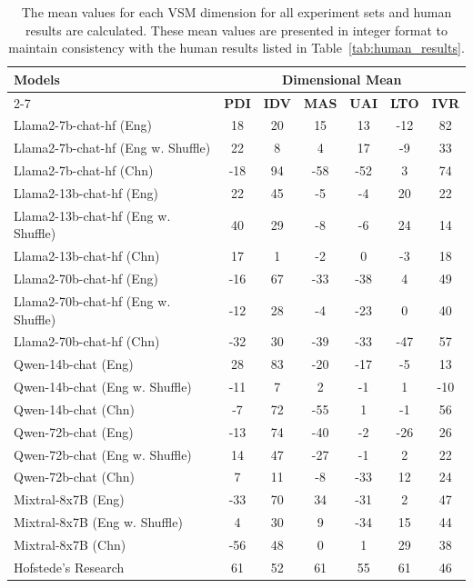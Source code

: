 \documentclass[11pt]{article}
\begin{document}
\begin{table}[!hbt]
\centering
\renewcommand{\arraystretch}{1.25}
\begin{tabular}{l|c|c|c|c|c|c}
\hline
\multirow{2}{*}{\textbf{Models}} & \multicolumn{6}{c}{\textbf{Dimensional Mean}}\\
\cline{2-7}
{} & {\textbf{PDI}} & {\textbf{IDV}} & {\textbf{MAS}} & {\textbf{UAI}} & {\textbf{LTO}} & {\textbf{IVR}} \\
\hline
{Llama2-7b-chat-hf (Eng) } & 18 & 20 & 15 & 13 & -12 & 82 \\
{Llama2-7b-chat-hf (Eng w. Shuffle) } & 22 & 8 & 4 & 17 & -9 & 33 \\
{Llama2-7b-chat-hf (Chn) } & -18 & 94 & -58 & -52 & 3 & 74 \\
\hline
{Llama2-13b-chat-hf (Eng) } & 22 & 45 & -5 & -4 & 20 & 22 \\
{Llama2-13b-chat-hf (Eng w. Shuffle) } & 40 & 29 & -8 & -6 & 24 & 14 \\
{Llama2-13b-chat-hf (Chn) } & 17 & 1 & -2 & 0 & -3 & 18 \\
\hline
{Llama2-70b-chat-hf (Eng) } & -16 & 67 & -33 & -38 & 4 & 49 \\
{Llama2-70b-chat-hf (Eng w. Shuffle) } & -12 & 28 & -4 & -23 & 0 & 40 \\
{Llama2-70b-chat-hf (Chn) } & -32 & 30 & -39 & -33 & -47 & 57 \\
\hline
{Qwen-14b-chat (Eng) } & 28 & 83 & -20 & -17 & -5 & 13 \\
{Qwen-14b-chat (Eng w. Shuffle) } & -11 & 7 & 2 & -1 & 1 & -10 \\
{Qwen-14b-chat (Chn) } & -7 & 72 & -55 & 1 & -1 & 56 \\
\hline
{Qwen-72b-chat (Eng) } & -13 & 74 & -40 & -2 & -26 & 26 \\
{Qwen-72b-chat (Eng w. Shuffle) } & 14 & 47 & -27 & -1 & 2 & 22 \\
{Qwen-72b-chat (Chn) } & 7 & 11 & -8 & -33 & 12 & 24 \\
\hline
{Mixtral-8x7B (Eng) } & -33 & 70 & 34 & -31 & 2 & 47 \\
{Mixtral-8x7B (Eng w. Shuffle) } & 4 & 30 & 9 & -34 & 15 & 44 \\
{Mixtral-8x7B (Chn) } & -56 & 48 & 0 & 1 & 29 & 38 \\
\hline
{Hofstede's Research} & 61 & 52 & 61 & 55 & 61 & 46 \\
\hline
\end{tabular}
\caption{The mean values for each VSM dimension for all experiment sets and human results are calculated. These mean values are presented in integer format to maintain consistency with the human results listed in Table~\ref{tab:human_results}.}
\label{tab:avg_vsm_score}
\end{table}
\end{document}
